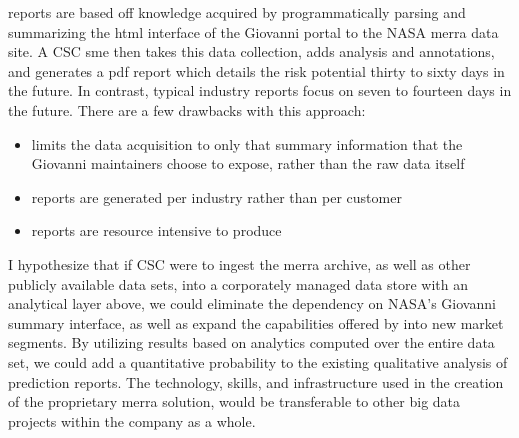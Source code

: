 \climatedge reports are based off knowledge acquired by programmatically parsing and summarizing the \gls{html} interface of the Giovanni\cite{giovanni} portal to the NASA \gls{merra} data site.  A \textsc{CSC} \gls{sme} then takes this data collection, adds analysis and annotations, and generates a \gls{pdf} report which details the risk potential thirty to sixty days in the future. In contrast, typical industry reports focus on seven to fourteen days in the future. There are a few drawbacks with this approach:
\begin{itemize}
    \item{limits the data acquisition to only that summary information that the Giovanni  maintainers choose to expose, rather than the raw data itself}
    \item{reports are generated per industry rather than per customer}
    \item{reports are resource intensive to produce}
\end{itemize}
I hypothesize that if \textsc{CSC} were to ingest the \gls{merra} archive, as well as other publicly available data sets, into a corporately managed data store with an analytical layer above, we could eliminate the dependency on NASA's Giovanni summary interface, as well as expand the capabilities offered by \climatedge into new market segments. By utilizing results based on analytics computed over the entire data set, we could add a quantitative probability to the existing qualitative analysis of \climatedge prediction reports. The technology, skills, and infrastructure used in the creation of the proprietary \gls{merra} solution, would be transferable to other big data projects within the company as a whole.\\

